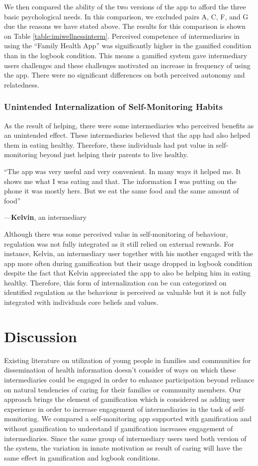 \documentclass{sig-alternate}
\newenvironment{myquote}
               {\list{}{\rightmargin   \leftmargin
                        \parsep        0in }%
                \item\relax}
               {\endlist}
\newcommand{\userquote}[2]{\begin{samepage}\begin{myquote} 
     \em{\small{#2\begin{flushright}---#1\end{flushright}}}
   \end{myquote}\end{samepage}}
\begin{document}
We then compared the ability of the two versions of the app to afford the three basic psychological needs. In this comparison, we excluded pairs A, C, F, and G due the reasons we have stated above. The results for this comparison is shown on Table \ref{table:imiwellnessinterm}. Perceived competence of intermediaries in using the ``Family Health App'' was significantly higher in the gamified condition than in the logbook condition. This means a gamified system gave intermediary users challenges and these challenges motivated an increase in frequency of using the app. There were no significant differences on both perceived autonomy and relatedness. 
\subsubsection{Unintended Internalization of Self-Monitoring Habits}
As the result of helping, there were some intermediaries who perceived benefits as an unintended effect. These intermediaries believed that the app had also helped them in eating healthy. Therefore, these individuals had put value in self-monitoring beyond just helping their parents to live healthy. 

\userquote{\textbf{Kelvin}, an intermediary} {``The app was very useful and very convenient. In many ways it helped me.  It shows me what I was eating and that. The information I was putting on the phone it was mostly hers. But we eat the same food and the same amount of food''} 

Although there was some perceived value in self-monitoring of behaviour, regulation was not fully integrated as it still relied on external rewards. For instance, Kelvin, an intermediary user together with his mother engaged with the app more often during gamification but their usage dropped in logbook condition despite the fact that Kelvin appreciated the app to also be helping him in eating healthy. Therefore, this form of internalization can be can categorized on identified regulation as the behaviour is perceived as valuable but it is not fully integrated with individuals core beliefs and values.

\section{Discussion}
Existing literature on utilization of young people in families and communities for dissemination of health information doesn't consider of ways on which these intermediaries could be engaged in order to enhance participation beyond reliance on natural tendencies of caring for their families or community members. Our approach brings the element of gamification which is considered as adding user experience in order to increase engagement of intermediaries in the task of self-monitoring. We compared a self-monitoring app supported with gamification and without gamification to understand if gamification increases engagement of intermediaries. Since the same group of intermediary users used both version of the system, the variation in innate motivation as result of caring will have the same effect in gamification and logbook conditions.
   
\end{document}
